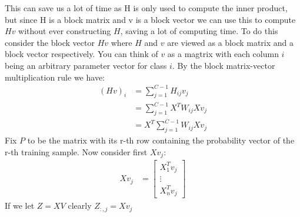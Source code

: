 \documentclass[12pt]{article}
\begin{document}
This can save us a lot of time as H is only used to compute the inner product,
but since H is a block matrix and v is a block vector we can use this to compute $Hv$
without ever constructing $H$, saving a lot of computing time. To do this consider
the block vector $Hv$ where $H$ and $v$ are viewed as a block matrix and a block vector
respectively. You can think of $v$ as a magtrix with each column $i$ being an arbitrary 
parameter vector for class $i$. By the block matrix-vector multiplication rule we have:
\begin{align*}
    (Hv)_i &= \displaystyle \sum_{j = 1}^{C-1} H_{ij}v_j \\
    &= \sum_{j = 1}^{C-1} X^TW_{ij}Xv_j \\
    &= X^T\sum_{j = 1}^{C-1} W_{ij}Xv_j
\end{align*}
Fix $P$ to be the matrix with its r-th row containing the probability vector
of the r-th training sample. Now consider first $Xv_j$:
\begin{align*}
    Xv_j &= \begin{bmatrix}
        X_1^Tv_j \\ \vdots \\ X_n^Tv_j
    \end{bmatrix}
\end{align*}
If we let $Z = XV$ clearly $Z_{:, j} = Xv_j$
\end{document}

